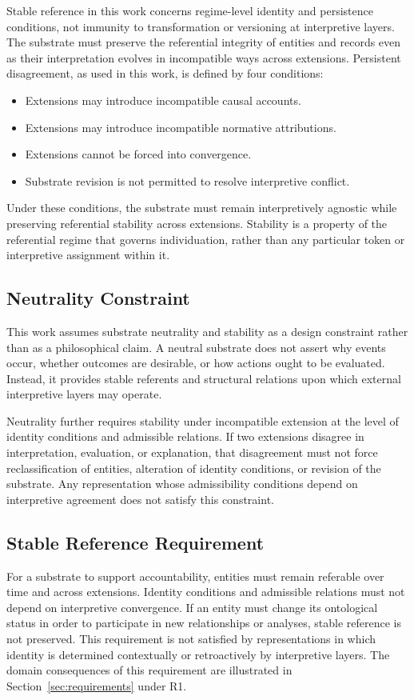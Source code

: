 Stable reference in this work concerns regime-level identity and persistence conditions,
not immunity to transformation or versioning at interpretive layers.
The substrate must preserve the referential integrity of entities and records
even as their interpretation evolves in incompatible ways across extensions.
Persistent disagreement, as used in this work, is defined by four conditions:
\begin{itemize}
\item Extensions may introduce incompatible causal accounts.
\item Extensions may introduce incompatible normative attributions.
\item Extensions cannot be forced into convergence.
\item Substrate revision is not permitted to resolve interpretive conflict.
\end{itemize}
Under these conditions, the substrate must remain interpretively agnostic
while preserving referential stability across extensions.
Stability is a property of the referential regime that governs individuation,
rather than any particular token or interpretive assignment within it.

\subsection{Neutrality Constraint}

This work assumes substrate neutrality and stability
as a design constraint rather than as a philosophical claim.
A neutral substrate does not assert why
events occur, whether outcomes are desirable, or
how actions ought to be evaluated.
Instead, it provides stable referents and structural relations upon which
external interpretive layers may operate.

Neutrality further requires stability under incompatible extension
at the level of identity conditions and admissible relations.
If two extensions disagree in interpretation, evaluation, or explanation,
that disagreement must not force reclassification of entities, alteration
of identity conditions, or revision of the substrate.
Any representation whose admissibility conditions depend on interpretive
agreement does not satisfy this constraint.

\subsection{Stable Reference Requirement}
\label{sec:stable_reference_requirement}
For a substrate to support accountability, entities must remain referable
over time and across extensions.
Identity conditions and admissible relations must not depend
on interpretive convergence.
If an entity must change its ontological status in order to participate in new
relationships or analyses, stable reference is not preserved.
This requirement is not satisfied by representations in which identity is
determined contextually or retroactively by interpretive layers.
The domain consequences of this requirement are illustrated in
Section~\ref{sec:requirements} under R1.

